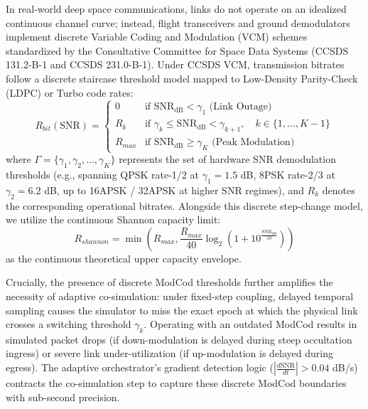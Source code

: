 \documentclass[a4paper,fleqn]{cas-sc}
\begin{document}
In real-world deep space communications, links do not operate on an idealized continuous channel curve; instead, flight transceivers and ground demodulators implement discrete Variable Coding and Modulation (VCM) schemes standardized by the Consultative Committee for Space Data Systems (CCSDS 131.2-B-1 and CCSDS 231.0-B-1). Under CCSDS VCM, transmission bitrates follow a discrete staircase threshold model mapped to Low-Density Parity-Check (LDPC) or Turbo code rates:
\begin{equation}
    R_{bit}(\text{SNR}) = \begin{cases}
        0 & \text{if } \text{SNR}_{\text{dB}} < \gamma_1 \text{ (Link Outage)} \\
        R_k & \text{if } \gamma_k \le \text{SNR}_{\text{dB}} < \gamma_{k+1}, \quad k \in \{1, \dots, K-1\} \\
        R_{max} & \text{if } \text{SNR}_{\text{dB}} \ge \gamma_K \text{ (Peak Modulation)}
    \end{cases}
    \label{eq:modcod}
\end{equation}
where $\Gamma = \{\gamma_1, \gamma_2, \dots, \gamma_K\}$ represents the set of hardware SNR demodulation thresholds (e.g., spanning QPSK rate-1/2 at $\gamma_1 = 1.5$ dB, 8PSK rate-2/3 at $\gamma_2 = 6.2$ dB, up to 16APSK / 32APSK at higher SNR regimes), and $R_k$ denotes the corresponding operational bitrates. Alongside this discrete step-change model, we utilize the continuous Shannon capacity limit:
\begin{equation}
    R_{shannon} = \min\left(R_{max}, \frac{R_{max}}{40} \log_2\left(1 + 10^{\frac{\text{SNR}_{\text{dB}}}{10}}\right)\right)
    \label{eq:shannon}
\end{equation}
as the continuous theoretical upper capacity envelope. 

Crucially, the presence of discrete ModCod thresholds further amplifies the necessity of adaptive co-simulation: under fixed-step coupling, delayed temporal sampling causes the simulator to miss the exact epoch at which the physical link crosses a switching threshold $\gamma_k$. Operating with an outdated ModCod results in simulated packet drops (if down-modulation is delayed during steep occultation ingress) or severe link under-utilization (if up-modulation is delayed during egress). The adaptive orchestrator's gradient detection logic ($\left|\frac{d\text{SNR}}{dt}\right| > 0.04$ dB/s) contracts the co-simulation step to capture these discrete ModCod boundaries with sub-second precision.
\end{document}
